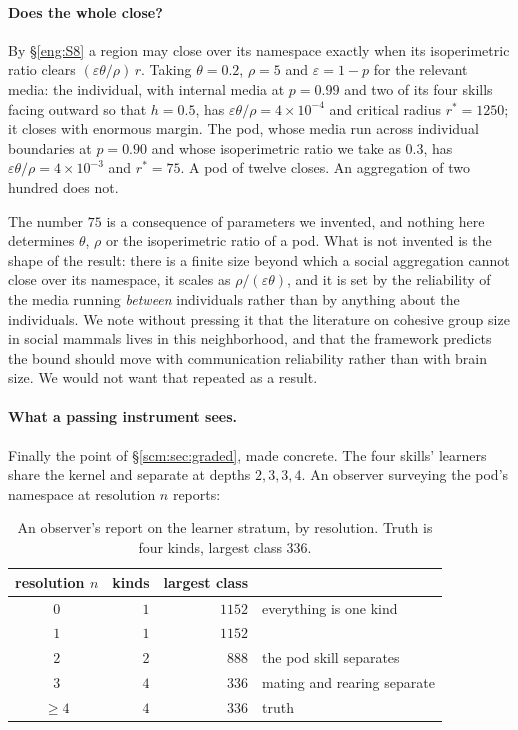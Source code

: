 \paragraph{Does the whole close?}
By \S\ref{eng:S8} a region may close over its namespace exactly when its
isoperimetric ratio clears $(\varepsilon\theta/\rho)\,r$. Taking
$\theta = 0.2$, $\rho = 5$ and $\varepsilon = 1-p$ for the relevant media:
the individual, with internal media at $p = 0.99$ and two of its four
skills facing outward so that $h = 0.5$, has
$\varepsilon\theta/\rho = 4\times 10^{-4}$ and critical radius
$r^\ast = 1250$; it closes with enormous margin. The pod, whose media run
across individual boundaries at $p = 0.90$ and whose isoperimetric ratio
we take as $0.3$, has $\varepsilon\theta/\rho = 4\times 10^{-3}$ and
$r^\ast = 75$. A pod of twelve closes. An aggregation of two hundred does
not.

\begin{remark}
\label{scm:rmk:groupsize}
The number $75$ is a consequence of parameters we invented, and nothing
here determines $\theta$, $\rho$ or the isoperimetric ratio of a pod. What
is not invented is the shape of the result: there is a finite size beyond
which a social aggregation cannot close over its namespace, it scales as
$\rho/(\varepsilon\theta)$, and it is set by the reliability of the media
running \emph{between} individuals rather than by anything about the
individuals. We note without pressing it that the literature on cohesive
group size in social mammals lives in this neighborhood, and that the
framework predicts the bound should move with communication reliability
rather than with brain size. We would not want that repeated as a result.
\end{remark}

\paragraph{What a passing instrument sees.}
Finally the point of \S\ref{scm:sec:graded}, made concrete. The four
skills' learners share the kernel and separate at depths $2, 3, 3, 4$. An
observer surveying the pod's namespace at resolution $n$ reports:

\begin{table}[h]
\centering
\small
\begin{tabular}{crrl}
\toprule
resolution $n$ & kinds & largest class & \\
\midrule
$0$ & $1$ & $1152$ & everything is one kind \\
$1$ & $1$ & $1152$ & \\
$2$ & $2$ & $888$ & the pod skill separates \\
$3$ & $4$ & $336$ & mating and rearing separate \\
$\ge 4$ & $4$ & $336$ & truth \\
\bottomrule
\end{tabular}
\caption{An observer's report on the learner stratum, by resolution. Truth
is four kinds, largest class $336$.}
\label{scm:tab:observer}
\end{table}

